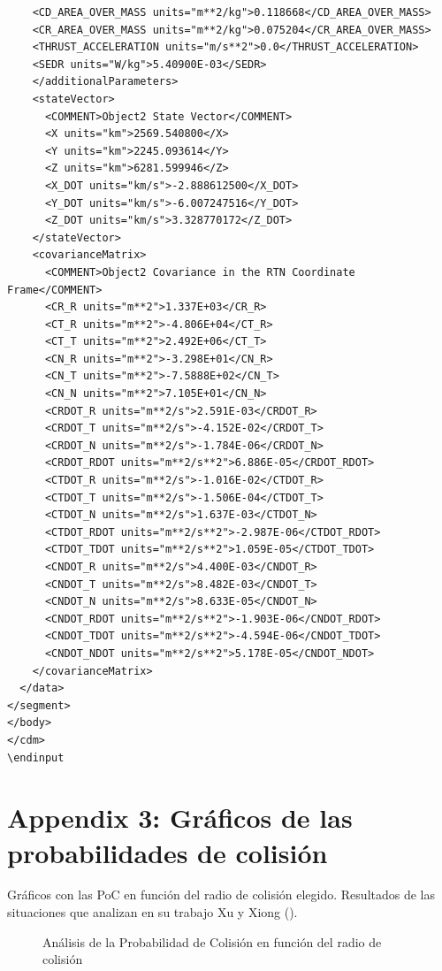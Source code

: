 \begin{lstlisting}
    <CD_AREA_OVER_MASS units="m**2/kg">0.118668</CD_AREA_OVER_MASS>
    <CR_AREA_OVER_MASS units="m**2/kg">0.075204</CR_AREA_OVER_MASS>
    <THRUST_ACCELERATION units="m/s**2">0.0</THRUST_ACCELERATION>
    <SEDR units="W/kg">5.40900E-03</SEDR>
    </additionalParameters>
    <stateVector>
      <COMMENT>Object2 State Vector</COMMENT>
      <X units="km">2569.540800</X>
      <Y units="km">2245.093614</Y>
      <Z units="km">6281.599946</Z>
      <X_DOT units="km/s">-2.888612500</X_DOT>
      <Y_DOT units="km/s">-6.007247516</Y_DOT>
      <Z_DOT units="km/s">3.328770172</Z_DOT>
    </stateVector>
    <covarianceMatrix>
      <COMMENT>Object2 Covariance in the RTN Coordinate Frame</COMMENT>
      <CR_R units="m**2">1.337E+03</CR_R>
      <CT_R units="m**2">-4.806E+04</CT_R>
      <CT_T units="m**2">2.492E+06</CT_T>
      <CN_R units="m**2">-3.298E+01</CN_R>
      <CN_T units="m**2">-7.5888E+02</CN_T>
      <CN_N units="m**2">7.105E+01</CN_N>
      <CRDOT_R units="m**2/s">2.591E-03</CRDOT_R>
      <CRDOT_T units="m**2/s">-4.152E-02</CRDOT_T>
      <CRDOT_N units="m**2/s">-1.784E-06</CRDOT_N>
      <CRDOT_RDOT units="m**2/s**2">6.886E-05</CRDOT_RDOT>
      <CTDOT_R units="m**2/s">-1.016E-02</CTDOT_R>
      <CTDOT_T units="m**2/s">-1.506E-04</CTDOT_T>
      <CTDOT_N units="m**2/s">1.637E-03</CTDOT_N>
      <CTDOT_RDOT units="m**2/s**2">-2.987E-06</CTDOT_RDOT>
      <CTDOT_TDOT units="m**2/s**2">1.059E-05</CTDOT_TDOT>
      <CNDOT_R units="m**2/s">4.400E-03</CNDOT_R>
      <CNDOT_T units="m**2/s">8.482E-03</CNDOT_T>
      <CNDOT_N units="m**2/s">8.633E-05</CNDOT_N>
      <CNDOT_RDOT units="m**2/s**2">-1.903E-06</CNDOT_RDOT>
      <CNDOT_TDOT units="m**2/s**2">-4.594E-06</CNDOT_TDOT>
      <CNDOT_NDOT units="m**2/s**2">5.178E-05</CNDOT_NDOT>
    </covarianceMatrix>
  </data>
</segment>
</body>
</cdm>
\endinput
\end{lstlisting}

\section{Appendix 3: Gr\'aficos de las probabilidades de colisi\'on}
\label{App2}

Gr\'aficos con las PoC en funci\'on del radio de colisi\'on elegido. 
Resultados de las situaciones que analizan en su trabajo Xu y Xiong (\citep{xu2014method}).


\begin{figure}[!h]
  \centering
  \caption{An\'alisis de la Probabilidad de Colisi\'on en funci\'on del radio de colisi\'on}
  \label{fig:pocvsraEsc4}
\end{figure}

